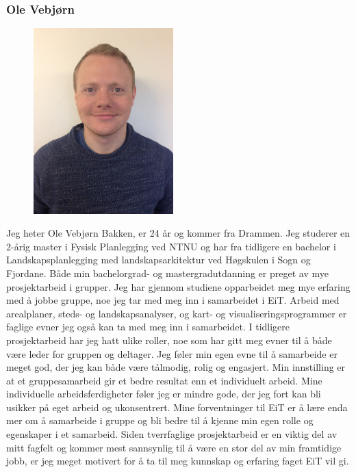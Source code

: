 \subsubsection{Ole Vebjørn}
\begin{figure}
  \vspace{-20pt}
  \begin{hfill}
    \includegraphics[scale=0.05, angle = 270, width=0.48\textwidth]{img_vebbe.JPG}
  \end{hfill}
  \vspace{-12pt}
\end{figure}
Jeg heter Ole Vebjørn Bakken, er 24 år og kommer fra Drammen. Jeg studerer en 2-årig master i Fysisk Planlegging ved NTNU og har fra tidligere en bachelor i Landskapsplanlegging med landskapsarkitektur ved Høgskulen i Sogn og Fjordane. Både min bachelorgrad- og mastergradutdanning er preget av mye prosjektarbeid i grupper. Jeg har gjennom studiene opparbeidet meg mye erfaring med å jobbe gruppe, noe jeg tar med meg inn i samarbeidet i EiT. Arbeid med arealplaner, steds- og landskapsanalyser, og kart- og visualiseringsprogrammer er faglige evner jeg også kan ta med meg inn i samarbeidet. I tidligere prosjektarbeid har jeg hatt ulike roller, noe som har gitt meg evner til å både være leder for gruppen og deltager. Jeg føler min egen evne til å samarbeide er meget god, der jeg kan både være tålmodig, rolig og engasjert. Min innstilling er at et gruppesamarbeid gir et bedre resultat enn et individuelt arbeid. Mine individuelle arbeidsferdigheter føler jeg er mindre gode, der jeg fort kan bli usikker på eget arbeid og ukonsentrert. Mine forventninger til EiT er å lære enda mer om å samarbeide i gruppe og bli bedre til å kjenne min egen rolle og egenskaper i et samarbeid. Siden tverrfaglige prosjektarbeid er en viktig del av mitt fagfelt og kommer mest sannsynlig til å være en stor del av min framtidige jobb, er jeg meget motivert for å ta til meg kunnskap og erfaring faget EiT vil gi.


